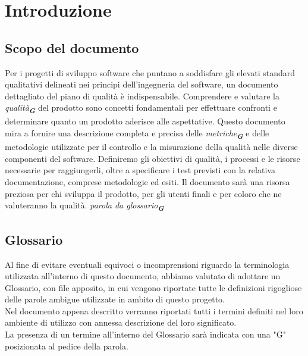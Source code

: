 

\section{Introduzione}
\label{sec:introduzione}

\subsection{Scopo del documento}
Per i progetti di sviluppo software che puntano a soddisfare gli elevati 
standard qualitativi delineati nei principi dell'ingegneria del software, 
un documento dettagliato del piano di qualità è indispensabile.
Comprendere e valutare la \emph{qualità}\textsubscript{\textit{\textbf{G}}} 
del prodotto sono concetti fondamentali 
per effettuare confronti e determinare quanto un prodotto aderisce alle aspettative.
Questo documento mira a fornire una descrizione completa e precisa delle 
\emph{metriche}\textsubscript{\textit{\textbf{G}}} e delle 
metodologie utilizzate per il controllo e la misurazione 
della qualità nelle diverse componenti del software.
Definiremo gli obiettivi di qualità, i processi e le risorse necessarie per 
raggiungerli, oltre a specificare i test previsti con la relativa documentazione, 
comprese metodologie ed esiti.
Il documento sarà una risorsa preziosa per chi sviluppa il prodotto, per gli 
utenti finali e per coloro che ne valuteranno la qualità.
\emph{parola da glossario}\textsubscript{\textit{\textbf{G}}}

\subsection{Glossario}
Al fine di evitare eventuali equivoci o incomprensioni riguardo la terminologia 
utilizzata all’interno di questo documento, 
abbiamo valutato di adottare un Glossario, con file apposito, in cui
vengono riportate tutte le definizioni rigogliose delle parole ambigue utilizzate 
in ambito di
questo progetto.\\
Nel documento appena descritto verranno riportati tutti i termini definiti nel
loro ambiente di utilizzo con annessa descrizione del loro significato.\\
La presenza di un termine all'interno del Glossario sarà indicata con una "G" 
posizionata al pedice della parola.

